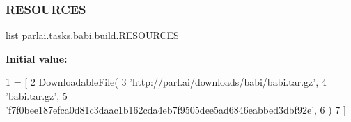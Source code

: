 \subsubsection{\texorpdfstring{R\+E\+S\+O\+U\+R\+C\+ES}{RESOURCES}}
{\footnotesize\ttfamily list parlai.\+tasks.\+babi.\+build.\+R\+E\+S\+O\+U\+R\+C\+ES}

{\bfseries Initial value\+:}
\begin{DoxyCode}
1 =  [
2     DownloadableFile(
3         \textcolor{stringliteral}{'http://parl.ai/downloads/babi/babi.tar.gz'},
4         \textcolor{stringliteral}{'babi.tar.gz'},
5         \textcolor{stringliteral}{'f7f0bee187efca0d81c3daac1b162cda4eb7f9505dee5ad6846eabbed3dbf92e'},
6     )
7 ]
\end{DoxyCode}
